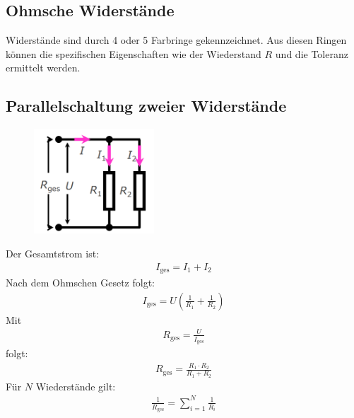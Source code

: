 \documentclass{article}
\begin{document}
\subsection{Ohmsche Widerstände}
Widerstände sind durch 4 oder 5 Farbringe gekennzeichnet. Aus diesen Ringen können die spezifischen Eigenschaften 
wie der Wiederstand $R$ und die Toleranz ermittelt werden.

\subsection{Parallelschaltung zweier Widerstände}
\begin{figure}[H]
    \centering
    \includegraphics[width=0.4\textwidth]{parallelschaltung.png}
\end{figure}
Der Gesamtstrom ist:
\begin{align}
    I_\text{ges}=I_1+I_2
\end{align}
Nach dem Ohmschen Gesetz folgt:
\begin{align}
    I_\text{ges}=U\left(\frac{1}{R_1}+\frac{1}{R_2}\right)
\end{align}
Mit 
\begin{align}
    R_\text{ges}=\frac{U}{I_\text{ges}}
\end{align}
folgt:
\begin{align}
    R_\text{ges}=\frac{R_1\cdot R_2}{R_1+R_2}
\end{align}
Für $N$ Wiederstände gilt:
\begin{align}
    \frac{1}{R_\text{ges}}=\sum_{i=1}^{N}\frac{1}{R_i}
\end{align}
\end{document}
